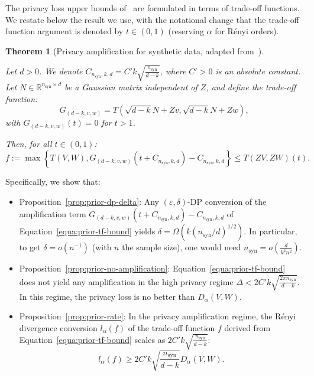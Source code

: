 \documentclass{article}
\theoremstyle{plain}
\newtheorem{theorem}{Theorem}[section]
\theoremstyle{definition}
\theoremstyle{remark}
\begin{document}
The privacy loss upper bounds of~\citet{pierquin2025} are formulated in terms of trade-off functions. We restate below the result we use, with the notational change that the trade-off function argument is denoted by $t\in(0,1)$ (reserving $\alpha$ for Rényi orders).
\begin{theorem}[Privacy amplification for synthetic data, adapted from~\citep{pierquin2025}]
\label{theo:convergence-trade-off-multi-dim}

    Let $d > 0$. We denote $C_{n_{\text{syn}},k,d} =  C'k \sqrt{\frac{n_{\text{syn}}}{d-k}}$, where $C' > 0$ is an absolute constant. Let $N \in \mathbb{R}^{n_{\text{syn}} \times d}$ be a Gaussian matrix independent of $Z$, and define the trade-off function: \[G_{(d-k,v,w)} = T\left(\sqrt{d-k}N + Zv,  \sqrt{d-k}N + Zw\right),\]
    with $G_{(d-k,v,w)}(t) = 0$ for $t > 1$.
    
    Then, for all $t \in (0,1)$:
    \begin{equation}
    \label{equa:prior-tf-bound}
        f:=\max\left\{T(V,W),G_{(d-k,v,w)}\left(t + C_{n_{\text{syn}},k,d}\right) -C_{n_{\text{syn}},k,d}\right\} \leq T(ZV,ZW)(t).
    \end{equation}
\end{theorem}

Specifically, we show that:
\begin{itemize}
    \item Proposition~\ref{prop:prior-dp-delta}: Any $(\varepsilon,\delta)$-DP conversion of the amplification term $G_{(d-k,v,w)}\left(t + C_{n_{\text{syn}},k,d}\right) -C_{n_{\text{syn}},k,d}$ of Equation~\ref{equa:prior-tf-bound} yields $\delta = \Omega\left(k(n_{\text{syn}}/d)^{1/2}\right)$. In particular, to get $\delta = o(n^{-1})$ (with $n$ the sample size), one would need $n_\text{syn} = o\left(\frac{d}{k^2 n^2}\right)$.
    \item Proposition~\ref{prop:prior-no-amplification}: Equation~\ref{equa:prior-tf-bound} does not yield any amplification in the high privacy regime $\Delta  < 2C'k \sqrt{\frac{2\pi n_{\text{syn}}}{d-k}}$. In this regime, the privacy loss is no better than $D_\alpha(V,W)$. 
    \item Proposition~\ref{prop:prior-rate}: In the privacy amplification regime, the Rényi divergence conversion $l_\alpha(f)$ of the trade-off function $f$ derived from Equation~\ref{equa:prior-tf-bound} scales as $2C'k \sqrt{\frac{ n_{\text{syn}}}{d-k}}$: \[l_\alpha(f) \geq 2C'k \sqrt{\frac{ n_{\text{syn}}}{d-k}} D_\alpha(V,W).\]
\end{itemize}
\end{document}

